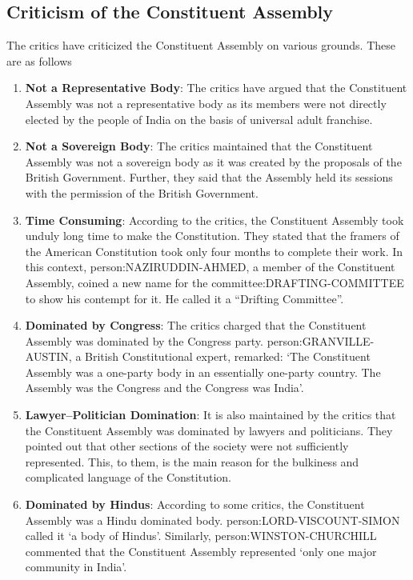 \begin{multicols}{2}
\section{Criticism of the Constituent Assembly}

The critics have criticized the Constituent Assembly on various grounds. These are as follows

\begin{enumerate}
  \item \textbf{Not a Representative Body}: The critics have argued that the Constituent  Assembly was not a representative body as its members were not directly elected by the people of India on the basis of universal adult franchise.
  \item \textbf{Not a Sovereign Body}: The critics maintained that the Constituent Assembly was not a sovereign body as it was created by the proposals of the British Government. Further, they said that the Assembly held its sessions with the permission of the British Government.
  \item \textbf{Time Consuming}: According to the critics, the Constituent Assembly took unduly long time to make the Constitution. They stated that the framers of the American Constitution took only four months to complete their work. In this context, \gls{person:NAZIRUDDIN-AHMED}, a member of the Constituent Assembly, coined a new name for the \gls{committee:DRAFTING-COMMITTEE} to show his contempt for it. He called it a ``Drifting Committee''.
  \item \textbf{Dominated by Congress}: The critics charged that the Constituent Assembly was dominated by the Congress party. \gls{person:GRANVILLE-AUSTIN}, a British Constitutional expert, remarked: `The Constituent Assembly was a one-party body in an essentially one-party country. The Assembly was the Congress and the Congress was India'.
  \item \textbf{Lawyer–Politician Domination}: It is also maintained by the critics that the Constituent Assembly was dominated by lawyers and politicians. They pointed out that other sections of the society were not sufficiently represented. This, to them, is the main reason for the bulkiness and complicated language of the Constitution.
  \item \textbf{Dominated by Hindus}: According to some critics, the Constituent Assembly was a Hindu dominated body. \gls{person:LORD-VISCOUNT-SIMON} called it `a body of Hindus'. Similarly, \gls{person:WINSTON-CHURCHILL} commented that the Constituent Assembly represented `only one major community in India'.
\end{enumerate}



\end{multicols}
